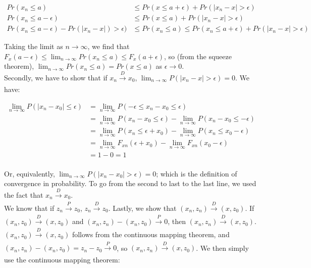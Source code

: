 \documentclass[11pt]{article}
\begin{document}
\begin{align*}
Pr(x_n \leq a) &\leq Pr(x \leq a + \epsilon) + Pr(|x_n - x| > \epsilon)\\
Pr(x_n \leq a-\epsilon) &\leq Pr(x \leq a) + Pr(|x_n - x| > \epsilon)\\
Pr(x_n \leq a-\epsilon) -Pr(|x_n - x|) > \epsilon)&\leq Pr(x_n \leq a)  \leq Pr(x_n \leq a+\epsilon) +Pr(|x_n - x|>\epsilon)
\end{align*}

Taking the limit as $n \to \infty$, we find that
$F_x(a-\epsilon) \leq \lim_{n \to \infty } Pr(x_n \leq a) \leq F_x(a+\epsilon)$, so (from the squeeze theorem), $\lim_{n \to \infty }Pr(x_n \leq a)  = Pr(x \leq a)$ as $\epsilon \to 0$.\\

Secondly, we have to show that if $x_n \xrightarrow[]{D} x_0$,  $\lim_{n \to \infty }P(|x_n -x| > \epsilon) = 0$. We have:

\begin{align*}
    \lim_{n \to \infty }P(|x_n-x_0| \leq \epsilon) &=   \lim_{n \to \infty } P(-\epsilon\leq x_n-x_0 \leq \epsilon)\\
    &=  \lim_{n \to \infty }P(x_n-x_0 \leq \epsilon) - \lim_{n \to \infty }P(x_n-x_0 \leq - \epsilon)\\
    &=  \lim_{n \to \infty }P(x_n \leq \epsilon+x_0) - \lim_{n \to \infty }P(x_n \leq x_0 - \epsilon)\\
      &=  \lim_{n \to \infty }F_{xn}(\epsilon+x_0) - \lim_{n \to \infty }F_{xn}(x_0-\epsilon) \\ &= 1-0=1\\
\end{align*}

Or, equivalently,  $\lim_{n \to \infty }P(|x_n -x_0| > \epsilon) = 0$; which is the definition of convergence in probability. To go from the second to last to the last line, we used the fact that $x_n \xrightarrow[]{D} x_0$. \\




We know that if $z_n \xrightarrow[]{P} z_0$, $z_n \xrightarrow[]{D} z_0$. Lastly, we show that $(x_n, z_n)\xrightarrow[]{D} (x, z_0)$.  If $(x_n, z_0) \xrightarrow[]{D} (x, z_0)$ and $(x_n, z_n) - (x_n, z_0) \xrightarrow[]{P} 0$, then $(x_n, z_n) \xrightarrow[]{D} (x, z_0)$.  $(x_n, z_0) \xrightarrow[]{D} (x, z_0)$  follows from the continuous mapping theorem, and $(x_n, z_n) - (x_n, z_0) = z_n - z_0 \xrightarrow[]{P} 0$, so  $(x_n, z_n) \xrightarrow[]{D} (x, z_0)$. We then simply use the continuous mapping theorem:
\end{document}
